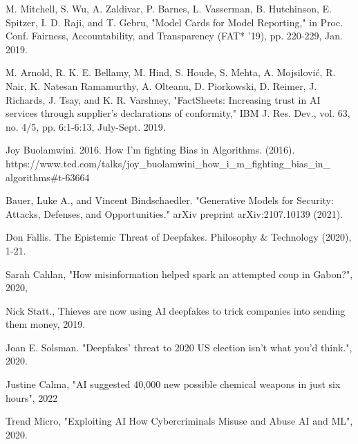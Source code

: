 \documentclass[conference]{IEEEtran}
\begin{document}
\begin{thebibliography}{00}
     M. Mitchell, S. Wu, A. Zaldivar, P. Barnes, L. Vasserman, B. Hutchinson, E. Spitzer, I. D. Raji, and T. Gebru, "Model Cards for Model Reporting," in Proc. Conf. Fairness, Accountability, and Transparency (FAT* '19), pp. 220-229, Jan. 2019.

     M. Arnold, R. K. E. Bellamy, M. Hind, S. Houde, S. Mehta, A. Mojsilović, R. Nair, K. Natesan Ramamurthy, A. Olteanu, D. Piorkowski, D. Reimer, J. Richards, J. Tsay, and K. R. Varshney, "FactSheets: Increasing trust in AI services through supplier's declarations of conformity," IBM J. Res. Dev., vol. 63, no. 4/5, pp. 6:1-6:13, July-Sept. 2019. 

     Joy Buolamwini. 2016. How I'm fighting Bias in Algorithms. (2016). https://www.ted.com/talks/joy\_buolamwini\_how\_i\_m\_fighting\_bias\_in\_
    algorithms\#t-63664

     Bauer, Luke A., and Vincent Bindschaedler. "Generative Models for Security: Attacks, Defenses, and Opportunities." arXiv preprint arXiv:2107.10139 (2021).

     Don Fallis. The Epistemic Threat of Deepfakes. Philosophy \& Technology (2020), 1-21.
    
     Sarah Cahlan, "How misinformation helped spark an attempted coup in Gabon?", 2020, 

     Nick Statt., Thieves are now using AI deepfakes to trick companies into sending them money, 2019.

     Joan E. Solsman. "Deepfakes' threat to 2020 US election isn't what you'd think.", 2020. 

     Justine Calma, "AI suggested 40,000 new possible chemical weapons in just six hours", 2022

     Trend Micro, "Exploiting AI How Cybercriminals Misuse and Abuse AI and ML", 2020. 

\end{thebibliography}
\end{document}
